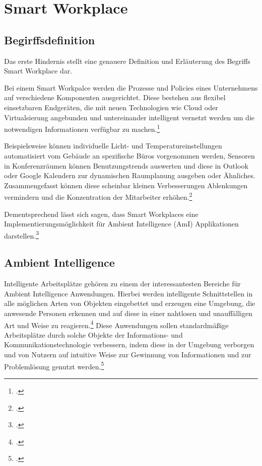 \newpage
\section{Smart Workplace}
\subsection{Begirffsdefinition}
Das erste Hindernis stellt eine genauere Definition und Erläuterung des Begriffs Smart Workplace dar. 

Bei einem Smart Workpalce werden die Prozesse und Policies eines Unternehmens auf verschiedene Komponenten ausgerichtet. Diese bestehen aus flexibel einsetzbaren Endgeräten, die mit neuen Technologien wie Cloud oder Virtualsierung angebunden und untereinander intelligent vernetzt werden um die notwendigen Informationen verfügbar zu machen.\footcite[Vgl.][]{nextchange}

Beispielsweise können individuelle Licht- und Temperatureinstellungen automatisiert vom Gebäude an spezifische Büros vorgenommen werden, Sensoren in Konferenzräumen können Benutzungstrends auswerten und diese in Outlook oder Google Kalendern zur dynamischen Raumplanung ausgeben oder Ähnliches. Zusammengefasst können diese scheinbar kleinen Verbesserungen Ablenkungen vermindern und die Konzentration der Mitarbeiter erhöhen.\footcite[Vgl.][]{iotagenda}

Dementsprechend lässt sich sagen, dass Smart Workplaces eine Implementierungsmöglichkeit für Ambient Intelligence (AmI) Applikationen darstellen.\footcite[Vgl.][Seite 401]{leseprobe}

\subsection{Ambient Intelligence}
Intelligente Arbeitsplätze gehören zu einem der interessantesten Bereiche für Ambient Intelligence Anwendungen. 
Hierbei werden intelligente Schnittstellen in alle möglichen Arten von Objekten eingebettet und erzeugen eine Umgebung, die anwesende Personen erkennen und auf diese in einer nahtlosen und unauffälligen Art und Weise zu reagieren.\footcite[Vgl.][Seite 1]{istag} Diese Anwendungen sollen standardmäßige Arbeitsplätze durch solche Objekte der Informations- und Kommunikationstechnologie verbessern, indem diese in der Umgebung verborgen und von Nutzern auf intuitive Weise zur Gewinnung von Informationen und zur Problemlösung genutzt werden.\footcite[Vgl.][Seite 401]{leseprobe}

